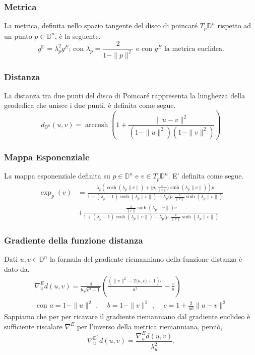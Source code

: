 \documentclass[a4paper, 12pt]{article}
\DeclareMathOperator\arccosh{arccosh}
\begin{document}
\subsubsection{Metrica}
La metrica, definita nello spazio tangente del disco di poincaré $T_p\mathbb{D}^n$ rispetto ad un punto $p \in \mathbb{D}^n$, è la seguente.\\
\[g^\mathbb{D} = \lambda_p^2 g^E \mbox{; con } \lambda_p = \frac{2}{1- \parallel p \parallel^2} \mbox{ e con } g^E \mbox{ la metrica euclidea}.\]
\subsubsection{Distanza}
La distanza tra due punti del disco di Poincaré rappresenta la lunghezza della geodedica che unisce i due punti, è definita come segue.\\
\[d_{\mathbb{D}^n}(u, v) = \arccosh \left(1 + \frac{\| u - v\|^2}{(1-\| u \|^2)(1-\| v \|^2)} \right)\]
\subsubsection{Mappa Esponenziale}
La mappa esponenziale definita su $p \in \mathbb{D}^n$ e $v \in T_p\mathbb{D}^n$. E' definita come segue.\\
\begin{equation*}\begin{split}
\exp_p(v) &= \frac{\lambda_p (\cosh(\lambda_p \| v \|) + \langle p,\frac{v}{\| v \|} \rangle \sinh(\lambda_p \| v \|))p}{1 + (\lambda_p - 1) \cosh(\lambda_p \| v \|) + \lambda_p \langle p, \frac{v}{\| v \|} \sinh(\lambda_p \| v \|)} \\
&+ \frac{\frac{1}{\| v \|} \sinh(\lambda_p \| v \|) v}{1 + (\lambda_p - 1) \cosh(\lambda_p \| v \|) + \lambda_p \langle p, \frac{v}{\| v \|} \sinh(\lambda_p \| v \|)}
\end{split}\end{equation*}
\subsubsection{Gradiente della funzione distanza}
Dati $u,v \in \mathbb{D}^n$ la formula del gradiente riemanniano della funzione distanza è dato da.\\
\begin{equation*}\begin{gathered}
\nabla_u^{E} d(u,v) = \frac{4}{b \sqrt{c^2 - 1}} \left(\frac{(\| v \|^2 - 2\langle u,v \rangle + 1)v}{a^2} - \frac{v}{a}\right) \\ \mbox{ con } a = 1 - \| u \|^2 \mbox{ , } \quad b = 1 - \| v \|^2 \mbox{ , } \quad c = 1 + \frac{2}{ab} \| u - v \|^2
\end{gathered}\end{equation*}
Sappiamo che per per ricavare il gradiente riemanniano dal gradiente euclideo è sufficiente riscalare $\nabla^E$ per l'inverso della metrica riemanniana, perciò,\\ \[\nabla_u^{\mathbb{D}^n} d(u,v) = \frac{\nabla_u^{E} d(u,v)}{\lambda_u^2}.\]
\end{document}
